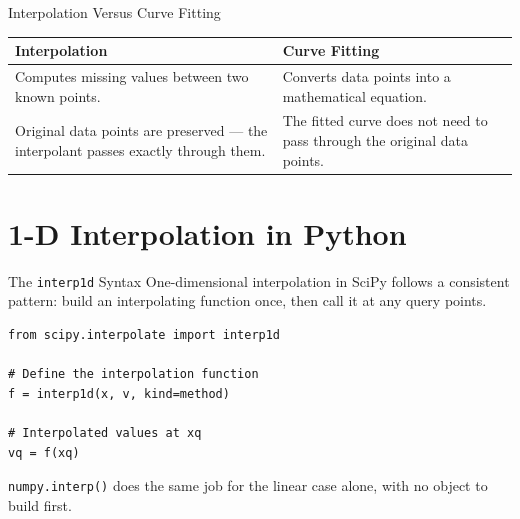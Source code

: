 \documentclass[9pt,aspectratio=169,xcolor=table]{beamer}
\begin{document}
\begin{frame}{Interpolation Versus Curve Fitting}
    \leavevmode
    \small
    \begin{table}
    \centering
    \begin{tabular}{p{}p{}}
        \toprule
        \textbf{Interpolation} & \textbf{Curve Fitting} \\
        \midrule
        Computes missing values between two known points. &
        Converts data points into a mathematical equation. \\[2mm]
        Original data points are preserved --- the interpolant passes
        exactly through them. &
        The fitted curve does not need to pass through the original data
        points. \\
        \bottomrule
    \end{tabular}
    \end{table}
\end{frame}

\section{1-D Interpolation in Python}

\begin{frame}[fragile]{The \texttt{interp1d} Syntax}
    \leavevmode
    One-dimensional interpolation in SciPy follows a consistent pattern:
    build an interpolating function once, then call it at any query
    points.

\begin{lstlisting}
from scipy.interpolate import interp1d

# Define the interpolation function
f = interp1d(x, v, kind=method)

# Interpolated values at xq
vq = f(xq)
\end{lstlisting}

    \vspace{2mm}
    \small
    \texttt{numpy.interp()} does the same job for the linear case alone,
    with no object to build first.
\end{frame}
\end{document}
